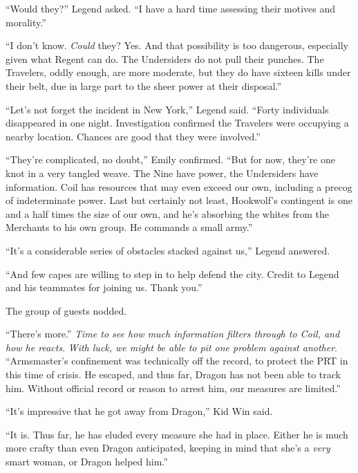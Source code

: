 ``Would they?''  Legend asked.  ``I have a hard time assessing their motives and morality.''



``I don't know.  \emph{Could} they?  Yes.  And that possibility is too dangerous, especially given what Regent can do.  The Undersiders do not pull their punches.  The Travelers, oddly enough, are more moderate, but they do have sixteen kills under their belt, due in large part to the sheer power at their disposal.''



``Let's not forget the incident in New York,'' Legend said.  ``Forty individuals disappeared in one night.  Investigation confirmed the Travelers were occupying a nearby location.  Chances are good that they were involved.''



``They're complicated, no doubt,'' Emily confirmed.  ``But for now, they're one knot in a very  tangled weave.  The Nine have power, the Undersiders have information.  Coil has resources that may even exceed our own, including a precog of indeterminate power.  Last but certainly not least, Hookwolf's contingent is one and a half times the size of our own, and he's absorbing the whites from the Merchants to his own group.  He commands a small army.''



``It's a considerable series of obstacles stacked against us,'' Legend answered.



``And few capes are willing to step in to help defend the city.  Credit to Legend and his teammates for joining us.  Thank you.''



The group of guests nodded.



``There's more.''  \emph{Time to see how much information filters through to Coil, and how he reacts}.  \emph{With luck, we might be able to pit one problem against another}.  ``Armsmaster's confinement was technically off the record, to protect the PRT in this time of crisis.  He escaped, and thus far, Dragon has not been able to track him.  Without official record or reason to arrest him, our measures are limited.''



``It's impressive that he got away from Dragon,'' Kid Win said.



``It is.  Thus far, he has eluded every measure she had in place.  Either he is much more crafty than even Dragon anticipated, keeping in mind that she's a \emph{very} smart woman, or Dragon helped him.''




